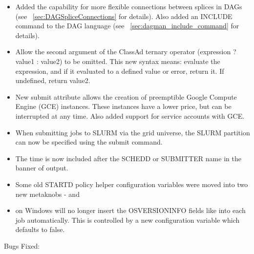 \begin{itemize}
\item Added the capability for more flexible connections between
splices in DAGs (see ~\ref{sec:DAGSpliceConnections} for details).
Also added an INCLUDE command to the DAG language (see
~\ref{sec:dagman_include_command} for details).

\item Allow the second argument of the ClassAd ternary operator
(expression ? value1 : value2) to be omitted.  This new syntax means:
evaluate the expression, and if it evaluated to a defined value or
error, return it.  If undefined, return value2.

\item New submit attribute  allows the
creation of preemptible Google Compute Engine (GCE) instances.
These instances have a lower price, but can be interrupted at any time.
Also added support for service accounts with GCE.

\item When submitting jobs to SLURM via the grid universe, the SLURM
partition can now be specified using the 
submit command.

\item The time is now included after the SCHEDD or SUBMITTER name
in the banner of  output.

\item Some old STARTD policy helper configuration variables were moved
into two new metaknobs - 
and 

\item {} on Windows will no longer insert the OSVERSIONINFO
fields like  into each job automatically. This
is controlled by a new configuration variable 
which defaults to false.


\end{itemize}

\noindent Bugs Fixed:

